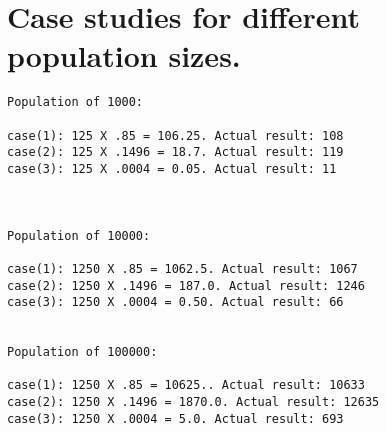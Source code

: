 \documentclass{article}
\begin{document}
\section{Case studies for different population sizes.}
\begin{lstlisting}
Population of 1000: 

case(1): 125 X .85 = 106.25. Actual result: 108
case(2): 125 X .1496 = 18.7. Actual result: 119
case(3): 125 X .0004 = 0.05. Actual result: 11



Population of 10000:

case(1): 1250 X .85 = 1062.5. Actual result: 1067
case(2): 1250 X .1496 = 187.0. Actual result: 1246
case(3): 1250 X .0004 = 0.50. Actual result: 66


Population of 100000:

case(1): 1250 X .85 = 10625.. Actual result: 10633
case(2): 1250 X .1496 = 1870.0. Actual result: 12635
case(3): 1250 X .0004 = 5.0. Actual result: 693


\end{lstlisting}
\end{document}
